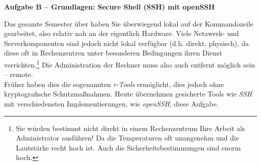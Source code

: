 \documentclass[paper=a4,fontsize=11pt]{scrartcl}%
\begin{document}
\begin{center}\Large{\textbf{Aufgabe B -- Grundlagen: Secure Shell (SSH) mit openSSH}}\end{center}\vskip0.25in
Das gesamte Semester über haben Sie überwiegend lokal auf der Kommandozeile gearbeitet, also relativ nah an der eigentlich Hardware. Viele Netzwerk- und Serverkomponenten sind jedoch nicht lokal verfügbar (d.h. direkt, physisch), da diese oft in Rechenzentren unter besonderen Bedingungen ihren Dienst verrichten.\footnote{Sie würden bestimmt nicht direkt in einem Rechenzentrum Ihre Arbeit als Administrator ausführen! Da die Temperaturen oft unangenehm und die Lautstärke recht hoch ist. Auch die Sicherheitsbestimmungen sind enorm hoch.} Die Administration der Rechner muss also auch entfernt möglich sein -- remote.\\
Früher haben dies die sogenannten \emph{r-Tools} ermöglicht, dies jedoch ohne kryptografische Schutzmaßnahmen. Heute übernehmen gesicherte Tools wie \emph{SSH} mit verschiedensten Implementierungen, wie \emph{openSSH}, diese Aufgabe.
\end{document}
